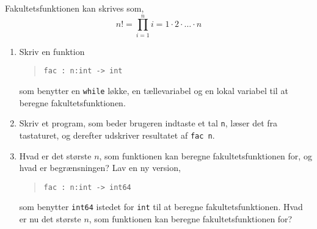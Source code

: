Fakultetsfunktionen kan skrives som,
  \begin{equation}
    n! = \prod_{i=1}^n i = 1\cdot 2\cdot \ldots \cdot n
  \end{equation}
  \begin{enumerate}
  \item Skriv en funktion
    \begin{quote}
      \mbox{\lstinline!fac : n:int -> int!}
    \end{quote}
    som benytter en \lstinline!while! løkke, en tællevariabel og en lokal variabel til at beregne fakultetsfunktionen.
  \item Skriv et program, som beder brugeren indtaste et tal \lstinline!n!, læser det fra tastaturet, og derefter udskriver resultatet af \lstinline!fac n!.
  \item Hvad er det største $n$, som funktionen kan beregne fakultetsfunktionen for, og hvad er begrænsningen? Lav en ny version, 
    \begin{quote}
      \mbox{\lstinline!fac : n:int -> int64!}
    \end{quote}
    som benytter \lstinline{int64} istedet for \lstinline{int} til at beregne fakultetsfunktionen. Hvad er nu det største $n$, som funktionen kan beregne fakultetsfunktionen for?
  \end{enumerate}
